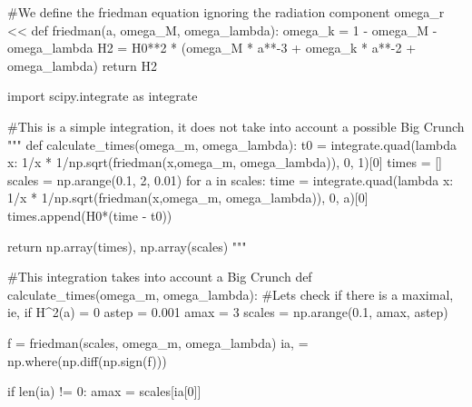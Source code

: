 \documentclass[
  letterpaper,
  DIV=11,
  numbers=noendperiod]{scrreprt}
\newenvironment{Shaded}{\begin{snugshade}}{\end{snugshade}}
\newcommand{\BuiltInTok}[1]{\textcolor[rgb]{0.00,0.23,0.31}{#1}}
\newcommand{\CommentTok}[1]{\textcolor[rgb]{0.37,0.37,0.37}{#1}}
\newcommand{\ControlFlowTok}[1]{\textcolor[rgb]{0.00,0.23,0.31}{#1}}
\newcommand{\DecValTok}[1]{\textcolor[rgb]{0.68,0.00,0.00}{#1}}
\newcommand{\FloatTok}[1]{\textcolor[rgb]{0.68,0.00,0.00}{#1}}
\newcommand{\ImportTok}[1]{\textcolor[rgb]{0.00,0.46,0.62}{#1}}
\newcommand{\KeywordTok}[1]{\textcolor[rgb]{0.00,0.23,0.31}{#1}}
\newcommand{\NormalTok}[1]{\textcolor[rgb]{0.00,0.23,0.31}{#1}}
\newcommand{\OperatorTok}[1]{\textcolor[rgb]{0.37,0.37,0.37}{#1}}
\begin{document}
\begin{tcolorbox}[enhanced jigsaw, toprule=.15mm, colframe=quarto-callout-color-frame, bottomrule=.15mm, leftrule=.75mm, left=2mm, breakable, rightrule=.15mm, arc=.35mm, opacityback=0, colback=white]
\begin{Shaded}
\begin{Highlighting}[]
\CommentTok{\#We define the friedman equation ignoring the radiation component omega\_r \textless{}\textless{}}
\KeywordTok{def}\NormalTok{ friedman(a, omega\_M, omega\_lambda):}
\NormalTok{    omega\_k }\OperatorTok{=} \DecValTok{1} \OperatorTok{{-}}\NormalTok{ omega\_M }\OperatorTok{{-}}\NormalTok{ omega\_lambda}
\NormalTok{    H2 }\OperatorTok{=}\NormalTok{ H0}\OperatorTok{**}\DecValTok{2} \OperatorTok{*}\NormalTok{ (omega\_M }\OperatorTok{*}\NormalTok{ a}\OperatorTok{**{-}}\DecValTok{3} \OperatorTok{+}\NormalTok{ omega\_k }\OperatorTok{*}\NormalTok{ a}\OperatorTok{**{-}}\DecValTok{2} \OperatorTok{+}\NormalTok{ omega\_lambda)}
    \ControlFlowTok{return}\NormalTok{ H2}

\ImportTok{import}\NormalTok{ scipy.integrate }\ImportTok{as}\NormalTok{ integrate}

\CommentTok{\#This is a simple integration, it does not take into account a possible Big Crunch}
\CommentTok{"""}
\CommentTok{def calculate\_times(omega\_m, omega\_lambda):}
\CommentTok{    t0 = integrate.quad(lambda x: 1/x * 1/np.sqrt(friedman(x,omega\_m, omega\_lambda)), 0, 1)[0]}
\CommentTok{    times = []}
\CommentTok{    scales = np.arange(0.1, 2, 0.01)}
\CommentTok{    for a in scales:}
\CommentTok{        time = integrate.quad(lambda x: 1/x * 1/np.sqrt(friedman(x,omega\_m, omega\_lambda)), 0, a)[0]}
\CommentTok{        times.append(H0*(time {-} t0))  }

\CommentTok{    return np.array(times), np.array(scales)}
\CommentTok{"""}

\CommentTok{\#This integration takes into account a Big Crunch}
\KeywordTok{def}\NormalTok{ calculate\_times(omega\_m, omega\_lambda):}
    \CommentTok{\#Lets check if there is a maximal, ie, if H\^{}2(a) = 0}
\NormalTok{    astep }\OperatorTok{=} \FloatTok{0.001}
\NormalTok{    amax }\OperatorTok{=} \DecValTok{3}
\NormalTok{    scales }\OperatorTok{=}\NormalTok{ np.arange(}\FloatTok{0.1}\NormalTok{, amax, astep)}

\NormalTok{    f }\OperatorTok{=}\NormalTok{ friedman(scales, omega\_m, omega\_lambda)}
\NormalTok{    ia, }\OperatorTok{=}\NormalTok{ np.where(np.diff(np.sign(f)))}

    \ControlFlowTok{if} \BuiltInTok{len}\NormalTok{(ia) }\OperatorTok{!=} \DecValTok{0}\NormalTok{:}
\NormalTok{        amax }\OperatorTok{=}\NormalTok{ scales[ia[}\DecValTok{0}\NormalTok{]]}
    

\end{Highlighting}
\end{Shaded}
\end{tcolorbox}
\end{document}
